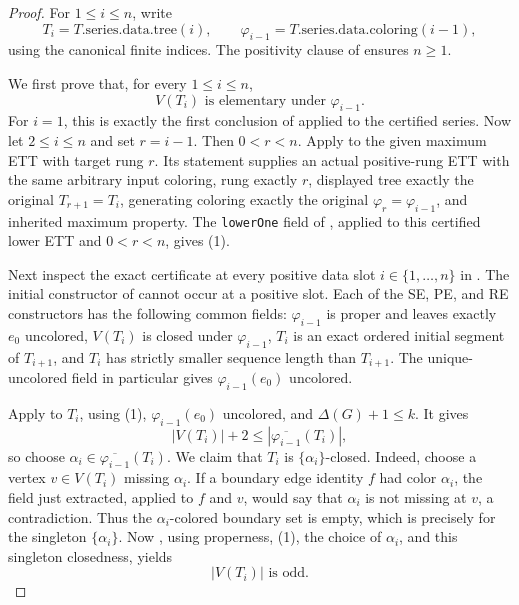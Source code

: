 \begin{proof}
For $1\leq i\leq n$, write
\[
 T_i=T.\mathrm{series.data.tree}(i),\qquad
 \varphi_{i-1}=T.\mathrm{series.data.coloring}(i-1),
\]
using the canonical finite indices.  The positivity clause of
 ensures $n\geq1$.

We first prove that, for every $1\leq i\leq n$,
\[
 V(T_i)\text{ is elementary under }\varphi_{i-1}.             \tag{1}
\]
For $i=1$, this is exactly the first conclusion of
 applied to the certified series.  Now let
$2\leq i\leq n$ and set $r=i-1$.  Then $0<r<n$.  Apply
 to the given maximum ETT with target
rung $r$.  Its statement supplies an actual positive-rung ETT with the
same arbitrary input coloring, rung exactly $r$, displayed tree exactly
the original $T_{r+1}=T_i$, generating coloring exactly the original
$\varphi_r=\varphi_{i-1}$, and inherited maximum property.  The
\texttt{lowerOne} field of , applied
to this certified lower ETT and $0<r<n$, gives (1).

Next inspect the exact certificate at every positive data slot
$i\in\{1,\ldots,n\}$ in .  The initial
constructor of  cannot occur at a positive
slot.  Each of the SE, PE, and RE constructors has the following common
fields: $\varphi_{i-1}$ is proper and leaves exactly $e_0$ uncolored,
$V(T_i)$ is closed under $\varphi_{i-1}$, $T_i$ is an exact ordered
initial segment of $T_{i+1}$, and $T_i$ has strictly smaller sequence
length than $T_{i+1}$.  The unique-uncolored field in particular gives
$\varphi_{i-1}(e_0)$ uncolored.

Apply  to $T_i$, using (1),
$\varphi_{i-1}(e_0)$ uncolored, and $\Delta(G)+1\leq k$.  It gives
\[
 |V(T_i)|+2\leq|\overline{\varphi_{i-1}}(T_i)|,               \tag{2}
\]
so choose
$\alpha_i\in\overline{\varphi_{i-1}}(T_i)$.  We claim that $T_i$ is
$\{\alpha_i\}$-closed.  Indeed, choose a vertex $v\in V(T_i)$ missing
$\alpha_i$.  If a boundary edge identity $f$ had color $\alpha_i$, the
 field just extracted, applied to $f$ and
$v$, would say that $\alpha_i$ is not missing at $v$, a contradiction.
Thus the $\alpha_i$-colored boundary set is empty, which is precisely
 for the singleton $\{\alpha_i\}$.  Now
, using properness, (1), the
choice of $\alpha_i$, and this singleton closedness, yields
\[
                         |V(T_i)|\text{ is odd}.               \tag{3}
\]


\end{proof}
